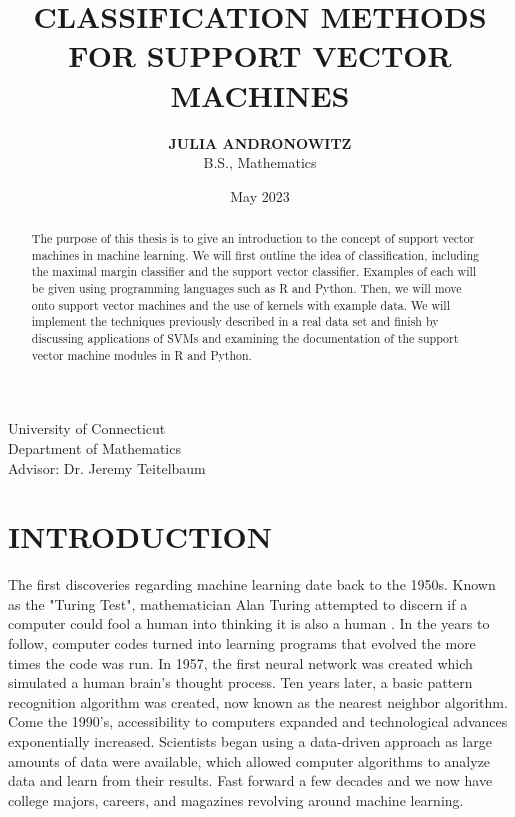\documentclass[12pt]{article}
\title{\textbf{CLASSIFICATION METHODS FOR SUPPORT VECTOR MACHINES}}
\author{\textbf{JULIA ANDRONOWITZ} \\ B.S., Mathematics}
\date{May 2023}
\begin{document}
\maketitle
\thispagestyle{empty}

\begin{adjustwidth}{0.5in}{0.5in}
\begin{abstract}
    The purpose of this thesis is to give an introduction to the concept of support vector machines in machine learning. We will first outline the idea of classification, including the maximal margin classifier and the support vector classifier. Examples of each will be given using programming languages such as R and Python. Then, we will move onto support vector machines and the use of kernels with example data. We will implement the techniques previously described in a real data set and finish by discussing applications of SVMs and examining the documentation of the support vector machine modules in R and Python.
\end{abstract}
\end{adjustwidth}

\vfill

\begin{center}
    University of Connecticut \\ Department of Mathematics \\ Advisor: Dr. Jeremy Teitelbaum
\end{center}

\newpage

\section{INTRODUCTION}

The first discoveries regarding machine learning date back to the 1950s. Known as the "Turing Test", mathematician Alan Turing attempted to discern if a computer could fool a human into thinking it is also a human \cite{mlhistory}. In the years to follow, computer codes turned into learning programs that evolved the more times the code was run. In 1957, the first neural network was created which simulated a human brain's thought process. Ten years later, a basic pattern recognition algorithm was created, now known as the nearest neighbor algorithm. Come the 1990's, accessibility to computers expanded and technological advances exponentially increased. Scientists began using a data-driven approach as large amounts of data were available, which allowed computer algorithms to analyze data and learn from their results. Fast forward a few decades and we now have college majors, careers, and magazines revolving around machine learning.
\end{document}
